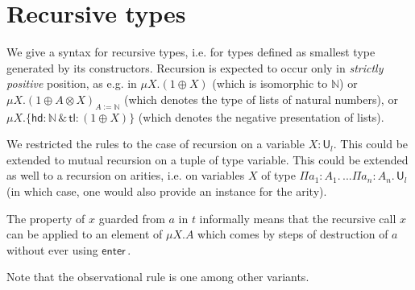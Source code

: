 \documentclass{article}
\newcommand{\mkprod}[3]{\Pi {#1}\!:\!{#2}.\,{#3}}
\newcommand{\nat}{\mathbb{N}}
\newcommand{\headname}{\mathsf{hd}}
\newcommand{\tailname}{\mathsf{tl}}
\newcommand{\sort}[1]{\mathsf{U}_{#1}}
\begin{document}
\section{Recursive types}

\newcommand{\inmu}[1]{\mathsf{enter}\,#1}
\newcommand{\appmu}[4]{\mathsf{fix\,}{#1}\,[\mathsf{enter}\,{#3}\,\mapsto\,{#2}]\,\mathsf{in}\,{#1}\,{#4}}

We give a syntax for recursive types, i.e. for types defined as
smallest type generated by its constructors. Recursion is expected to
occur only in {\em strictly positive} position, as e.g. in $\mu X.(1
\oplus X)$ (which is isomorphic to $\nat$) or $\mu X.(1 \oplus A
\otimes X)_{A:=\nat}$ (which denotes the type of lists of natural
numbers), or $\mu X.\{\headname : \nat \,\&\, \tailname : (1 \oplus X)\}$ (which
denotes the negative presentation of lists).

We restricted the rules to the case of recursion on a variable
$X:\sort{l}$. This could be extended to mutual recursion on a tuple of
type variable. This could be extended as well to a recursion on
arities, i.e. on variables $X$ of type
$\mkprod{a_1}{A_1}{...\mkprod{a_n}{A_n}{\sort{l}}}$ (in which case,
one would also provide an instance for the arity).

The property of $x$ guarded from $a$ in $t$ informally means that the
recursive call $x$ can be applied to an element of $\mu X. A$ which
comes by steps of destruction of $a$ without ever using $\inmu{}$.

Note that the observational rule is one among other variants.
\end{document}
